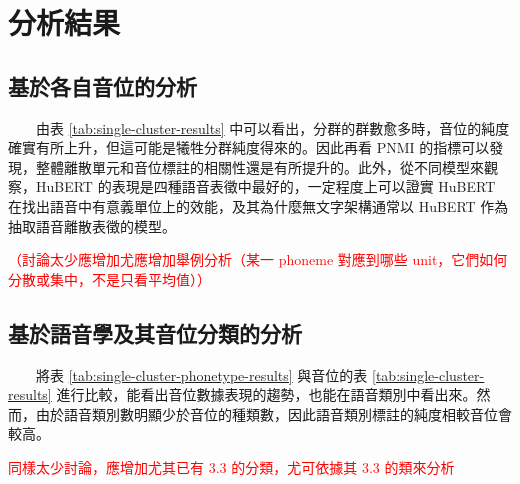 
\section{分析結果}

\subsection{基於各自音位的分析}



　　由表 \ref{tab:single-cluster-results} 中可以看出，分群的群數愈多時，音位的純度確實有所上升，但這可能是犧牲分群純度得來的。因此再看 PNMI 的指標可以發現，整體離散單元和音位標註的相關性還是有所提升的。此外，從不同模型來觀察，HuBERT 的表現是四種語音表徵中最好的，一定程度上可以證實 HuBERT 在找出語音中有意義單位上的效能，及其為什麼無文字架構通常以 HuBERT 作為抽取語音離散表徵的模型。

\textcolor{red}{（討論太少應增加尤應增加舉例分析（某一 phoneme 對應到哪些 unit，它們如何分散或集中，不是只看平均值））}

\subsection{基於語音學及其音位分類的分析}



　　將表 \ref{tab:single-cluster-phonetype-results} 與音位的表 \ref{tab:single-cluster-results} 進行比較，能看出音位數據表現的趨勢，也能在語音類別中看出來。然而，由於語音類別數明顯少於音位的種類數，因此語音類別標註的純度相較音位會較高。

\textcolor{red}{同樣太少討論，應增加尤其已有 3.3 的分類，尤可依據其 3.3 的類來分析}

\setcounter{section}{4}

